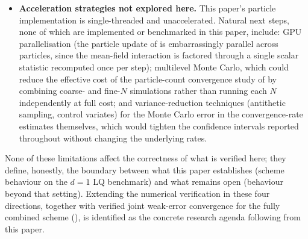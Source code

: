 \documentclass[11pt]{article}
\theoremstyle{remark}
\begin{document}
\begin{itemize}
    \item \textbf{Acceleration strategies not explored here.} This paper's
    particle implementation is single-threaded and unaccelerated. Natural next
    steps, none of which are implemented or benchmarked in this paper, include:
    GPU parallelisation (the particle update of  is
    embarrassingly parallel across particles, since the mean-field interaction
    is factored through a single scalar statistic recomputed once per step);
    multilevel Monte Carlo, which could reduce the effective cost of the
    particle-count convergence study of  by combining
    coarse- and fine-$N$ simulations rather than running each $N$ independently
    at full cost; and variance-reduction techniques (antithetic sampling,
    control variates) for the Monte Carlo error in the convergence-rate
    estimates themselves, which would tighten the confidence intervals reported
    throughout  without changing the underlying rates.
\end{itemize}

None of these limitations affect the correctness of what is verified here; they
define, honestly, the boundary between what this paper establishes (scheme
behaviour on the $d=1$ LQ benchmark) and what remains open (behaviour beyond
that setting). Extending the numerical verification in these four directions,
together with verified joint weak-error convergence for the fully combined
scheme (), is identified as the concrete research
agenda following from this paper.
\end{document}
